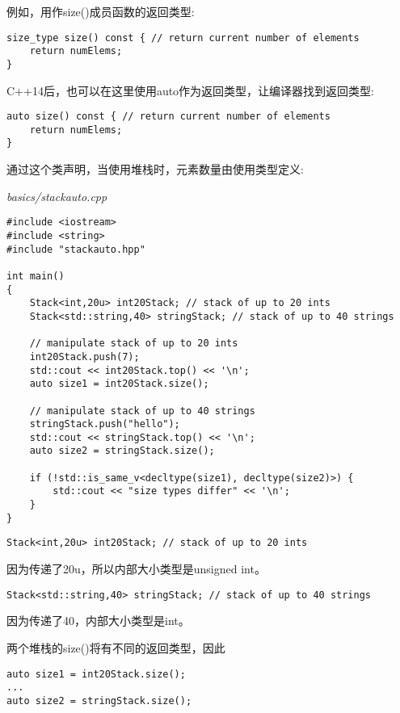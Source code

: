 例如，用作size()成员函数的返回类型:

\begin{lstlisting}[style=styleCXX]
size_type size() const { // return current number of elements
	return numElems;
}
\end{lstlisting}

C++14后，也可以在这里使用auto作为返回类型，让编译器找到返回类型:

\begin{lstlisting}[style=styleCXX]
auto size() const { // return current number of elements
	return numElems;
}
\end{lstlisting}

通过这个类声明，当使用堆栈时，元素数量由使用类型定义:

\noindent
\textit{basics/stackauto.cpp}
\begin{lstlisting}[style=styleCXX]
#include <iostream>
#include <string>
#include "stackauto.hpp"

int main()
{
	Stack<int,20u> int20Stack; // stack of up to 20 ints
	Stack<std::string,40> stringStack; // stack of up to 40 strings
	
	// manipulate stack of up to 20 ints
	int20Stack.push(7);
	std::cout << int20Stack.top() << '\n';
	auto size1 = int20Stack.size();
	
	// manipulate stack of up to 40 strings
	stringStack.push("hello");
	std::cout << stringStack.top() << '\n';
	auto size2 = stringStack.size();
	
	if (!std::is_same_v<decltype(size1), decltype(size2)>) {
		std::cout << "size types differ" << '\n';
	}
}
\end{lstlisting}


\begin{lstlisting}[style=styleCXX]
Stack<int,20u> int20Stack; // stack of up to 20 ints
\end{lstlisting}

因为传递了20u，所以内部大小类型是unsigned int。

\begin{lstlisting}[style=styleCXX]
Stack<std::string,40> stringStack; // stack of up to 40 strings
\end{lstlisting}

因为传递了40，内部大小类型是int。

两个堆栈的size()将有不同的返回类型，因此

\begin{lstlisting}[style=styleCXX]
auto size1 = int20Stack.size();
...
auto size2 = stringStack.size();
\end{lstlisting}

